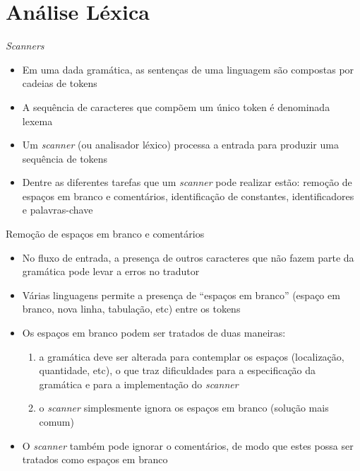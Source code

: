 \section{Análise Léxica}

\begin{frame}[fragile]{{\it Scanners}}

    \begin{itemize}
        \item Em uma dada gramática, as sentenças de uma linguagem são compostas por cadeias de tokens
        \pause

        \item A sequência de caracteres que compõem um único token é denominada lexema
        \pause

        \item Um \textit{scanner} (ou analisador léxico) processa a entrada para produzir uma sequência de tokens
        \pause

        \item Dentre as diferentes tarefas que um \textit{scanner} pode realizar estão: remoção de espaços em branco e comentários, identificação de
            constantes, identificadores e palavras-chave
    \end{itemize}

\end{frame}

\begin{frame}[fragile]{Remoção de espaços em branco e comentários}

    \begin{itemize}
        \item No fluxo de entrada, a presença de outros caracteres que não fazem parte da gramática pode levar a erros no tradutor
        \pause

        \item Várias linguagens permite a presença de ``espaços em branco'' (espaço em branco, nova linha, tabulação, etc) entre os tokens
        \pause

        \item Os espaços em branco podem ser tratados de duas maneiras:
        \pause
        \begin{enumerate}
            \item a gramática deve ser alterada para contemplar os espaços (localização, quantidade, etc), o que traz dificuldades para a especificação da gramática
            e para a implementação do \textit{scanner}
            \pause

            \item o \textit{scanner} simplesmente ignora os espaços em branco (solução mais comum)
        \end{enumerate}
        \pause

        \item O \textit{scanner} também pode ignorar o comentários, de modo que estes possa ser tratados como espaços em branco
    \end{itemize}

\end{frame}

